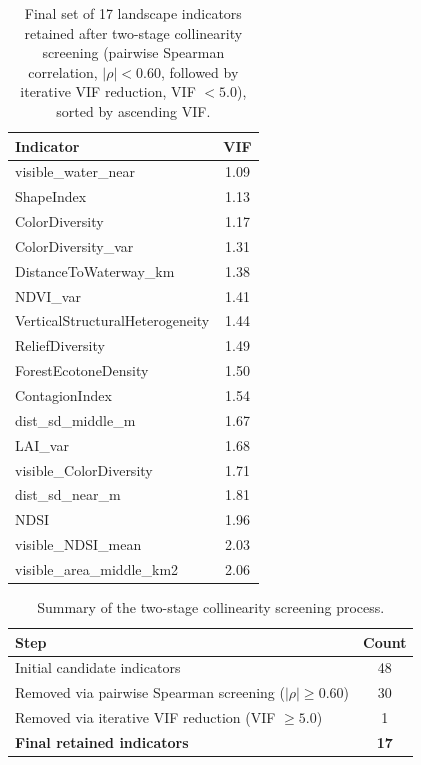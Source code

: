 \documentclass[hidelinks, 11pt]{article}
\begin{document}
\begin{table}[htbp]
\centering
\caption{Final set of 17 landscape indicators retained after two-stage collinearity screening (pairwise Spearman correlation, $|\rho| < 0.60$, followed by iterative VIF reduction, VIF $< 5.0$), sorted by ascending VIF.}
\label{tab:final_predictors_vif}
\begin{tabular}{@{}lc@{}}
\toprule
\textbf{Indicator} & \textbf{VIF} \\
\midrule
visible\_water\_near              & 1.09 \\
ShapeIndex                        & 1.13 \\
ColorDiversity                    & 1.17 \\
ColorDiversity\_var               & 1.31 \\
DistanceToWaterway\_km            & 1.38 \\
NDVI\_var                         & 1.41 \\
VerticalStructuralHeterogeneity   & 1.44 \\
ReliefDiversity                   & 1.49 \\
ForestEcotoneDensity              & 1.50 \\
ContagionIndex                    & 1.54 \\
dist\_sd\_middle\_m                & 1.67 \\
LAI\_var                          & 1.68 \\
visible\_ColorDiversity           & 1.71 \\
dist\_sd\_near\_m                  & 1.81 \\
NDSI                              & 1.96 \\
visible\_NDSI\_mean                & 2.03 \\
visible\_area\_middle\_km2          & 2.06 \\
\bottomrule
\end{tabular}
\end{table}

\begin{table}[htbp]
\centering
\caption{Summary of the two-stage collinearity screening process.}
\label{tab:screening_summary}
\begin{tabular}{@{}lc@{}}
\toprule
\textbf{Step} & \textbf{Count} \\
\midrule
Initial candidate indicators              & 48 \\
Removed via pairwise Spearman screening ($|\rho| \geq 0.60$) & 30 \\
Removed via iterative VIF reduction (VIF $\geq 5.0$)          & 1  \\
\textbf{Final retained indicators}        & \textbf{17} \\
\bottomrule
\end{tabular}
\end{table}
\end{document}
